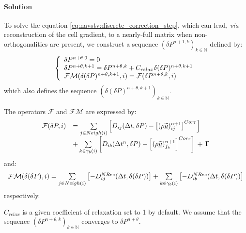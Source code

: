 \paragraph{Solution\\}
To solve the equation \eqref{eq:navstv:discrete_correction_step}, which can
lead, \emph{via}  reconstruction of the cell gradient, to a nearly-full matrix
when non-orthogonalities are present, we construct a sequence
$(\delta P^{n+1,k})_{k\in \mathbb{N}}$ defined by:
\begin{equation}
\left\{\begin{array}{l}
\delta P^{n+\theta,0} = 0\\
\delta P^{n+\theta,k+1} = \delta P^{n+\theta,k} + C_{relax} \delta (\delta P)^{n+\theta,k+1}\\
\mathcal{FM}(\delta(\delta P)^{n+\theta,k+1}, i) = \mathcal{F}(\delta P^{n+\theta,k}, i)
\end{array}\right.
\end{equation}
which also defines the sequence $({\delta(\delta P)^{n+\theta,k+1}})_{k\in
\mathbb{N}}$.

The operators $\mathcal{F}$ and $\mathcal{FM}$ are expressed by:
\begin{equation}
\begin{array}{ll}
\mathcal{F}(\delta P, i) &=
 \sum\limits_{j\in Neigh(i)}{\left[D_{{ij}}(\Delta t,\delta
P)-\left[(\rho \underline{\widetilde{u}})^{n+1}_{{ij}}\right]^{Corr}\right]}\\
&+\sum\limits_{k\in {\gamma_b(i)}} {\left[D_{{ib}}(\Delta
t^n,\delta P)-\left[(\rho \underline{\widetilde{u}})^{n+1}_{{f_{b}}}\right]^{Corr}\right]\,+\,\Gamma}
\end{array}
\end{equation}
%
and:
\begin{equation}
\begin{array}{ll}
\mathcal{FM}(\delta (\delta P), i) =
 \sum\limits_{j \in Neigh(i)}{\left[-D^{NRec}_{{ij}}(\Delta t,\delta
(\delta P))\right]} +\sum\limits_{k\in {\gamma_b(i)}}
\left[-D^{NRec}_{{ib}}(\Delta t,\delta(\delta P))\right]
\end{array}
\end{equation}
respectively.

$C_{relax}$ is a given coefficient of relaxation set to 1 by default.
We assume that the sequence $(\delta P^{n+\theta,k})_{k\in \mathbb{N}}$
converges
to $\delta P^{n+\theta}$.

